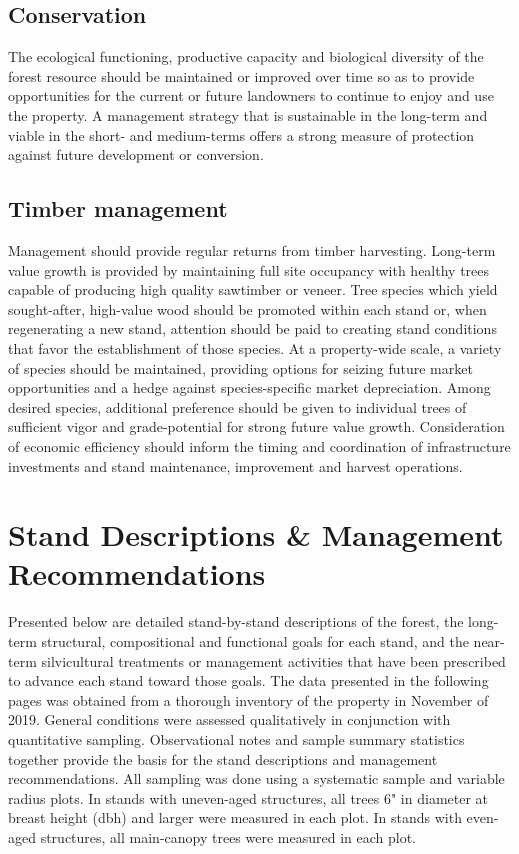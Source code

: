 \documentclass[]{tufte-handout}
\begin{document}
\subsection{Conservation}\label{conservation}

The ecological functioning, productive capacity and biological diversity
of the forest resource should be maintained or improved over time so as
to provide opportunities for the current or future landowners to
continue to enjoy and use the property. A management strategy that is
sustainable in the long-term and viable in the short- and medium-terms
offers a strong measure of protection against future development or
conversion.

\subsection{Timber management}\label{timber-management}

Management should provide regular returns from timber harvesting.
Long-term value growth is provided by maintaining full site occupancy
with healthy trees capable of producing high quality sawtimber or
veneer. Tree species which yield sought-after, high-value wood should be
promoted within each stand or, when regenerating a new stand, attention
should be paid to creating stand conditions that favor the establishment
of those species. At a property-wide scale, a variety of species should
be maintained, providing options for seizing future market opportunities
and a hedge against species-specific market depreciation. Among desired
species, additional preference should be given to individual trees of
sufficient vigor and grade-potential for strong future value growth.
Consideration of economic efficiency should inform the timing and
coordination of infrastructure investments and stand maintenance,
improvement and harvest operations.

\section{Stand Descriptions \& Management
Recommendations}\label{stand-descriptions-management-recommendations}

Presented below are detailed stand-by-stand descriptions of the forest,
the long-term structural, compositional and functional goals for each
stand, and the near-term silvicultural treatments or management
activities that have been prescribed to advance each stand toward those
goals. The data presented in the following pages was obtained from a
thorough inventory of the property in November of 2019. General
conditions were assessed qualitatively in conjunction with quantitative
sampling. Observational notes and sample summary statistics together
provide the basis for the stand descriptions and management
recommendations. All sampling was done using a systematic sample and
variable radius plots. In stands with uneven-aged structures, all trees
6" in diameter at breast height (dbh) and larger were measured in each
plot. In stands with even-aged structures, all main-canopy trees were
measured in each plot.
\end{document}
